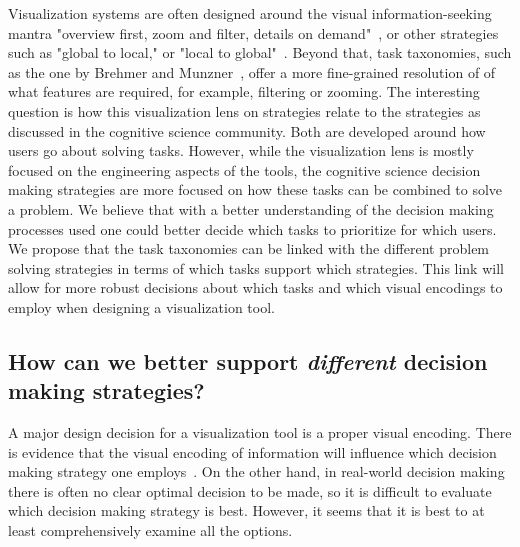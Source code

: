 Visualization systems are often designed around the visual information-seeking mantra "overview first, zoom and
filter, details on demand"~\cite{Shneiderman:1996}, or other strategies such as "global to local,"
or "local to global"~\cite{Sedlmair:2014}. Beyond that, task taxonomies, such as the one by Brehmer and Munzner~\citep{Brehmer:2013}, offer a more fine-grained resolution of
of what features are required, for example, filtering or zooming. 
The interesting question is how this visualization lens on strategies relate to the strategies as discussed in the cognitive science community. 
Both are developed around how users
go about solving tasks. However, while the visualization lens
is mostly focused on the engineering aspects of the tools, 
the cognitive science decision making strategies are more focused on how these tasks can be combined to
solve a problem.
We believe that with a better understanding of the decision making processes 
used one could better decide which tasks to prioritize for which users.
We propose that the task taxonomies can be linked with the different problem
solving strategies in terms of which tasks support which strategies. This 
link will allow for more robust decisions about
which tasks and which visual encodings to employ when designing a 
visualization tool.




\subsection{How can we better support \emph{different} decision making strategies?}

A major design decision for a visualization tool is a proper visual encoding.
There is evidence that the visual encoding of information will
influence which decision making strategy one employs~\citep{Jarvenpaa:1990}.
On the other hand, in real-world decision making there is often no clear
optimal decision to be made, so it is difficult to evaluate which decision
making strategy is best. However, it seems that it is best to at least
comprehensively examine all the options.

